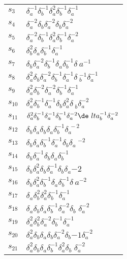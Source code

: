 \documentclass{article}
\begin{document}
\begin{center}
\begin{tabular}{ll}
$s_{3}$ & $\delta_a^{-1}\delta_b^{-1}\delta_a^{2}\delta_b^{-1}\delta_a^{-1}$ \\
$s_{4}$ & $\delta_a^{-2}\delta_b^{}\delta_a^{-2}\delta_b^{}\delta_a^{-2}$ \\
$s_{5}$ & $\delta_a^{-2}\delta_b^{-1}\delta_a^{2}\delta_b^{-1}\delta_a^{-2}$ \\
$s_{6}$ & $\delta_b^{2}\delta_a^{}\delta_b^{-1}\delta_a^{-1}$ \\
$s_{7}$ & $\delta_b^{}\delta_a^{-2}\delta_b^{-1}\delta_a^{}\delta_b^{-1}\delta_\
a^{-1}$ \\
$s_{8}$ & $\delta_a^{2}\delta_b^{}\delta_a^{-2}\delta_b^{-1}\delta_a^{-1}\delta\
_b^{-1}\delta_a^{-1}$ \\
$s_{9}$ & $\delta_a^{2}\delta_b^{-2}\delta_a^{-2}\delta_b^{-1}\delta_a^{-1}$ \\
$s_{10}$ & $\delta_a^{2}\delta_b^{-1}\delta_a^{-1}\delta_b^{}\delta_a^{2}\delta\
_b^{}\delta_a^{-2}$ \\
$s_{11}$ & $\delta_a^{2}\delta_b^{-1}\delta_a^{-1}\delta_b^{-1}\delta_a^{-2}\de\
lta_b^{-1}\delta_a^{-2}$ \\
$s_{12}$ & $\delta_b^{}\delta_a^{}\delta_b^{}\delta_a^{}\delta_b^{-1}\delta_a^{\
-2}$ \\
$s_{13}$ & $\delta_b^{}\delta_a^{}\delta_b^{-1}\delta_a^{-1}\delta_b^{}\delta_a\
^{-2}$ \\
$s_{14}$ & $\delta_b^{}\delta_a^{-1}\delta_b^{}\delta_a^{}\delta_b^{-1}$ \\
$s_{15}$ & $\delta_b^{}\delta_a^{2}\delta_b^{}\delta_a^{-1}\delta_b^{}\delta_a^\
{-2}$ \\
$s_{16}$ & $\delta_b^{}\delta_a^{2}\delta_b^{-1}\delta_a^{}\delta_b^{-1}\delta_\
a^{-2}$ \\
$s_{17}$ & $\delta_a^{}\delta_b^{2}\delta_a^{2}\delta_b^{-1}\delta_a^{-1}$ \\
$s_{18}$ & $\delta_a^{}\delta_b^{}\delta_a^{}\delta_b^{-1}\delta_a^{-2}\delta_b\
^{}\delta_a^{-2}$ \\
$s_{19}$ & $\delta_a^{2}\delta_b^{2}\delta_a^{-2}\delta_b^{-1}\delta_a^{-1}$ \\
$s_{20}$ & $\delta_a^{2}\delta_b^{}\delta_a^{}\delta_b^{}\delta_a^{-2}\delta_b^\
{-1}\delta_a^{-2}$ \\
$s_{21}$ & $\delta_a^{2}\delta_b^{}\delta_a^{}\delta_b^{-1}\delta_a^{2}\delta_b\
^{}\delta_a^{-2}$ \\
\bottomrule
\end{tabular}
\end{center}

\thispagestyle{empty}
\end{document}
